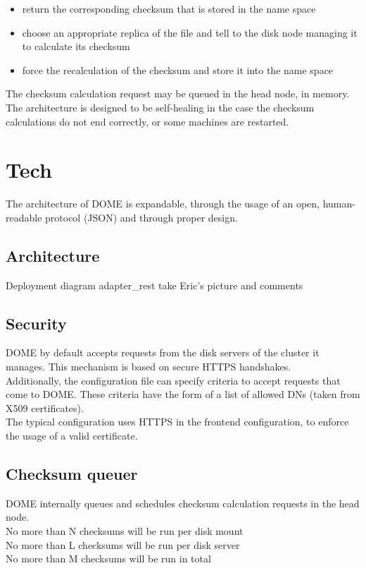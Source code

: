 \documentclass[a4paper,10pt]{scrreprt}
\begin{document}
\begin{itemize}
 \item return the corresponding checksum that is stored in the name space
 \item choose an appropriate replica of the file and tell to the disk node managing it to calculate its checksum
 \item force the recalculation of the checksum and store it into the name space
\end{itemize}

The checksum calculation request may be queued in the head node, in memory. The architecture is designed to be self-healing in the case the checksum
calculations do not end correctly, or some machines are restarted.





\section{Tech}

The architecture of DOME is expandable, through the usage of an open, human-readable protocol (JSON) and through proper design.\\


\subsection{Architecture}
Deployment diagram
adapter\_rest
take Eric's picture and comments

\subsection{Security}
DOME by default accepts requests from the disk servers of the cluster it manages. This mechanism is based on secure HTTPS handshakes.\\
Additionally, the configuration file can specify criteria to accept requests that come to DOME. These criteria have the form
of a list of allowed DNs (taken from X509 certificates).\\

The typical configuration uses HTTPS in the frontend configuration, to enforce the usage of a valid certificate.\\

\subsection{Checksum queuer}
 DOME internally queues and schedules checksum calculation requests in the head node.\\
 No more than N checksums will be run per disk mount\\
 No more than L checksums will be run per disk server\\
 No more than M checksums will be run in total\\
\end{document}
